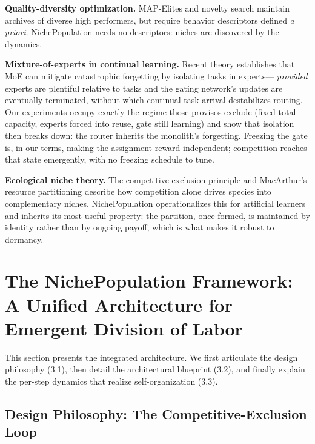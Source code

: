 \documentclass[11pt]{article}
\begin{document}
\textbf{Quality-diversity optimization.} MAP-Elites \cite{mouret2015illuminating}
and novelty search \cite{lehman2011evolving} maintain archives of diverse high performers, but require behavior descriptors defined
\emph{a priori}. NichePopulation needs no descriptors: niches are discovered by
the dynamics.

\textbf{Mixture-of-experts in continual learning.} Recent theory
\cite{li2024moecl} establishes that MoE can mitigate catastrophic forgetting by
isolating tasks in experts---%
\emph{provided} experts are plentiful relative to tasks and the gating network's
updates are eventually terminated, without which continual task arrival
destabilizes routing. Our experiments occupy exactly the regime those provisos
exclude (fixed total capacity, experts forced into reuse, gate still learning)
and show that isolation then breaks down: the router inherits the monolith's
forgetting. Freezing the gate is, in our terms, making the assignment
reward-independent; competition reaches that state emergently, with no freezing
schedule to tune.

\textbf{Ecological niche theory.} The competitive exclusion principle
\cite{gause1934struggle,hardin1960competitive} and MacArthur's resource
partitioning \cite{macarthur1958population} describe how competition alone
drives species into complementary niches. NichePopulation operationalizes this
for artificial learners and inherits its most useful property: the partition,
once formed, is maintained by identity rather than by ongoing payoff, which is
what makes it robust to dormancy.

\section{The NichePopulation Framework: A Unified Architecture for
Emergent Division of Labor}

This section presents the integrated architecture. We first articulate the
design philosophy (3.1), then detail the architectural blueprint (3.2), and
finally explain the per-step dynamics that realize self-organization (3.3).

\subsection{Design Philosophy: The Competitive-Exclusion Loop}
\end{document}
